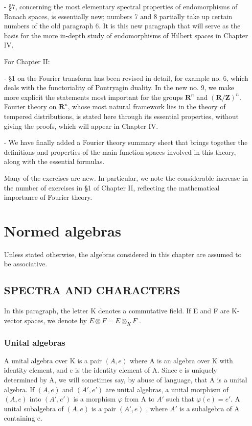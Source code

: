 - §7, concerning the most elementary spectral properties of endomorphisms of Banach spaces, is essentially new; numbers 7 and 8 partially take up certain numbers of the old paragraph 6. It is this new paragraph that will serve as the basis for the more in-depth study of endomorphisms of Hilbert spaces in Chapter IV.

For Chapter II:

- §1 on the Fourier transform has been revised in detail, for example no. 6, which deals with the functoriality of Pontryagin duality. In the new no. 9, we make more explicit the statements most important for the groups \(\mathbf{R}^n\) and \((\mathbf{R}/\mathbf{Z})^n\). Fourier theory on \(\mathbf{R}^n\), whose most natural framework lies in the theory of tempered distributions, is stated here through its essential properties, without giving the proofs, which will appear in Chapter IV.

- We have finally added a Fourier theory summary sheet that brings together the definitions and properties of the main function spaces involved in this theory, along with the essential formulas.

Many of the exercises are new. In particular, we note the considerable increase in the number of exercises in §1 of Chapter II, reflecting the mathematical importance of Fourier theory.

\chapter{Normed algebras}

Unless stated otherwise, the algebras considered in this chapter are assumed to be associative.

\section{SPECTRA AND CHARACTERS}

In this paragraph, the letter K denotes a commutative field. If E and F are K-vector spaces, we denote by \(E \otimes F = E \otimes_{K} F\) .

\subsection{Unital algebras}

A unital algebra over K is a pair \((A,e)\) where A is an algebra over K with identity element, and e is the identity element of A. Since e is uniquely determined by A, we will sometimes say, by abuse of language, that A is a unital algebra. If \((A,e)\) and \((A',e')\) are unital algebras, a unital morphism of \((A,e)\) into \((A',e')\) is a morphism \(\varphi\) from A to \(A'\) such that \(\varphi(e)=e'\). A unital subalgebra of \((A,e)\) is a pair \((A',e)\) , where \(A'\) is a subalgebra of A containing e.


